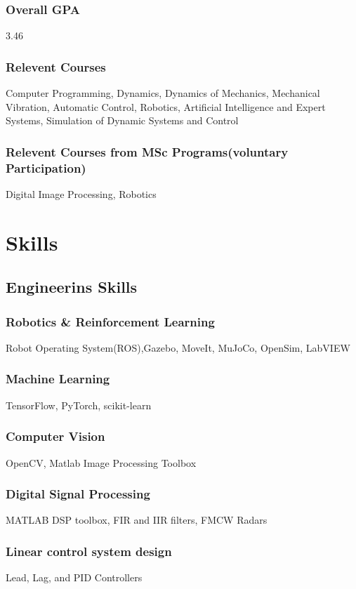 \documentclass[a4paper]{article}
\begin{document}
\subsubsection{Overall GPA}
3.46

\subsubsection{Relevent Courses}
Computer Programming, Dynamics, Dynamics of Mechanics, Mechanical Vibration, Automatic Control, Robotics, Artificial Intelligence and Expert Systems, Simulation of Dynamic Systems and Control

\subsubsection{Relevent Courses from MSc Programs(voluntary Participation)}
Digital Image Processing, Robotics

\section{Skills}
\subsection{Engineerins Skills}
\subsubsection{Robotics \& Reinforcement Learning}
Robot Operating System(ROS),Gazebo, MoveIt, MuJoCo, OpenSim, LabVIEW
\subsubsection{Machine Learning}
TensorFlow, PyTorch, scikit-learn
\subsubsection{Computer Vision}
OpenCV, Matlab Image Processing Toolbox
\subsubsection{Digital Signal Processing}
MATLAB DSP toolbox, FIR and IIR filters, FMCW Radars
\subsubsection{Linear control system design}
Lead, Lag, and PID Controllers
\end{document}
